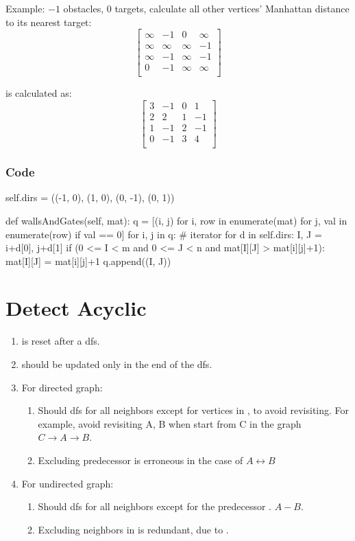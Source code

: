 Example:
$-1$ obstacles, $0$ targets, calculate all other vertices' Manhattan distance to its nearest target:
$$
\begin{bmatrix}
\infty & -1 & 0 & \infty \\
\infty & \infty & \infty & -1 \\
\infty & -1 & \infty & -1 \\
0 & -1 & \infty & \infty \\
\end{bmatrix} 
$$

is calculated as:
$$
\begin{bmatrix}
3 & -1 & 0 & 1 \\
2 & 2 & 1 & -1 \\
1 & -1 & 2 & -1 \\
0 & -1 & 3 & 4 \\
\end{bmatrix}
$$

\subsubsection*{Code}
\begin{python}
self.dirs = ((-1, 0), (1, 0), (0, -1), (0, 1))

def wallsAndGates(self, mat):
    q = [(i, j) for i, row in enumerate(mat) 
         for j, val in enumerate(row) if val == 0]
    for i, j in q:  # iterator
        for d in self.dirs:
            I, J = i+d[0], j+d[1]
            if (0 <= I < m and  0 <= J < n and 
                mat[I][J] > mat[i][j]+1):
                mat[I][J] = mat[i][j]+1
                q.append((I, J))
\end{python}



\section{Detect Acyclic}
\begin{enumerate}
\item {} is reset after a dfs. 
\item {} should be updated only in the end of the dfs. 
\item For directed graph:
\begin{enumerate}
\item Should dfs for all neighbors except for vertices in , to avoid revisiting. For example, avoid revisiting A, B when start from C in the graph $C \rightarrow A \rightarrow B$.
\item Excluding predecessor  is erroneous in the case of $A \leftrightarrow B$ 
\end{enumerate}
\item For undirected graph:
\begin{enumerate}
\item Should dfs for all neighbors except for the predecessor . $A-B$.
\item Excluding neighbors in  is redundant, due to . 
\end{enumerate}
\end{enumerate}

